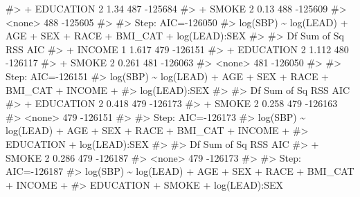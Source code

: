 \documentclass[
  letterpaper,
]{latex/krantz}
\makeatletter
\newenvironment{Shaded}{\begin{snugshade}}{\end{snugshade}}
\newcommand{\CommentTok}[1]{\textcolor[rgb]{0.37,0.37,0.37}{#1}}
\newenvironment{kframe}{%
\medskip{}
\setlength{\fboxsep}{.8em}
 \def\at@end@of@kframe{}%
 \ifinner\ifhmode%
  \def\at@end@of@kframe{\end{minipage}}%
  \begin{minipage}{\columnwidth}%
 \fi\fi%
 \def\FrameCommand##1{\hskip\@totalleftmargin \hskip-\fboxsep
 \colorbox{shadecolor}{##1}\hskip-\fboxsep
     \hskip-\linewidth \hskip-\@totalleftmargin \hskip\columnwidth}%
 \MakeFramed {\advance\hsize-\width
   \@totalleftmargin\z@ \linewidth\hsize
   \@setminipage}}%
 {\par\unskip\endMakeFramed%
 \at@end@of@kframe}
\renewenvironment{Shaded}{\begin{kframe}}{\end{kframe}}
\makeatother
\begin{document}
\begin{Shaded}
\begin{Highlighting}[]
\CommentTok{\#\textgreater{} + EDUCATION  2      1.34 487 {-}125684}
\CommentTok{\#\textgreater{} + SMOKE      2      0.13 488 {-}125609}
\CommentTok{\#\textgreater{} \textless{}none\textgreater{}                   488 {-}125605}
\CommentTok{\#\textgreater{} }
\CommentTok{\#\textgreater{} Step:  AIC={-}126050}
\CommentTok{\#\textgreater{} log(SBP) \textasciitilde{} log(LEAD) + AGE + SEX + RACE + BMI\_CAT + log(LEAD):SEX}
\CommentTok{\#\textgreater{} }
\CommentTok{\#\textgreater{}             Df Sum of Sq RSS     AIC}
\CommentTok{\#\textgreater{} + INCOME     1     1.617 479 {-}126151}
\CommentTok{\#\textgreater{} + EDUCATION  2     1.112 480 {-}126117}
\CommentTok{\#\textgreater{} + SMOKE      2     0.261 481 {-}126063}
\CommentTok{\#\textgreater{} \textless{}none\textgreater{}                   481 {-}126050}
\CommentTok{\#\textgreater{} }
\CommentTok{\#\textgreater{} Step:  AIC={-}126151}
\CommentTok{\#\textgreater{} log(SBP) \textasciitilde{} log(LEAD) + AGE + SEX + RACE + BMI\_CAT + INCOME + }
\CommentTok{\#\textgreater{}     log(LEAD):SEX}
\CommentTok{\#\textgreater{} }
\CommentTok{\#\textgreater{}             Df Sum of Sq RSS     AIC}
\CommentTok{\#\textgreater{} + EDUCATION  2     0.418 479 {-}126173}
\CommentTok{\#\textgreater{} + SMOKE      2     0.258 479 {-}126163}
\CommentTok{\#\textgreater{} \textless{}none\textgreater{}                   479 {-}126151}
\CommentTok{\#\textgreater{} }
\CommentTok{\#\textgreater{} Step:  AIC={-}126173}
\CommentTok{\#\textgreater{} log(SBP) \textasciitilde{} log(LEAD) + AGE + SEX + RACE + BMI\_CAT + INCOME + }
\CommentTok{\#\textgreater{}     EDUCATION + log(LEAD):SEX}
\CommentTok{\#\textgreater{} }
\CommentTok{\#\textgreater{}         Df Sum of Sq RSS     AIC}
\CommentTok{\#\textgreater{} + SMOKE  2     0.286 479 {-}126187}
\CommentTok{\#\textgreater{} \textless{}none\textgreater{}               479 {-}126173}
\CommentTok{\#\textgreater{} }
\CommentTok{\#\textgreater{} Step:  AIC={-}126187}
\CommentTok{\#\textgreater{} log(SBP) \textasciitilde{} log(LEAD) + AGE + SEX + RACE + BMI\_CAT + INCOME + }
\CommentTok{\#\textgreater{}     EDUCATION + SMOKE + log(LEAD):SEX}
\end{Highlighting}
\end{Shaded}
\end{document}

